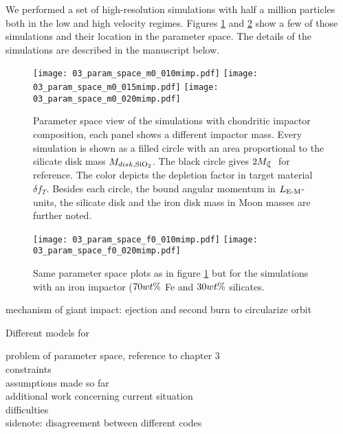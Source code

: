 We performed a set of high-resolution simulations with half a million particles both in the low and high velocity regimes. Figures \ref{ch05_fig03a} and \ref{ch05_fig03b} show a few of those simulations and their location in the parameter space. The details of the simulations are described in the manuscript below. 

\begin{figure}
\begin{center}
\texttt{[image: 03\_param\_space\_m0\_010mimp.pdf]}
\texttt{[image: 03\_param\_space\_m0\_015mimp.pdf]}
\texttt{[image: 03\_param\_space\_m0\_020mimp.pdf]}
\caption{Parameter space view of the simulations with chondritic impactor composition, each panel shows a different impactor mass. Every simulation is shown as a filled circle with an area proportional to the silicate disk mass $M_{disk, \mathrm{SiO}_2}$. The black circle gives $2 \ML$ for reference. The color depicts the depletion factor in target material $\delta f_T$. Besides each circle, the bound angular momentum in $L_{\textrm{E-M}}$-units, the silicate disk and the iron disk mass in Moon masses are further noted.}
\label{ch05_fig03a}
\end{center}
\end{figure}

\begin{figure}
\begin{center}
\texttt{[image: 03\_param\_space\_f0\_010mimp.pdf]}
\texttt{[image: 03\_param\_space\_f0\_020mimp.pdf]}
\caption{Same parameter space plots as in figure \ref{ch05_fig03a} but for the simulations with an iron impactor ($70 wt\mathrm{\%}$ Fe and $30 wt\mathrm{\%}$ silicates.}
\label{ch05_fig03b}
\end{center}
\end{figure}




mechanism of giant impact: ejection and second burn to circularize orbit

Different models for 

problem of parameter space, reference to chapter 3\\
constraints\\
assumptions made so far\\

additional work concerning
current situation\\

difficulties\\

sidenote: disagreement between different codes\\


